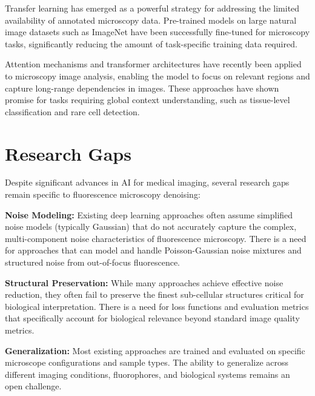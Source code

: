 \documentclass[12pt,a4paper]{report}
\begin{document}
\vspace{0.5cm}

Transfer learning has emerged as a powerful strategy for addressing the limited availability of annotated microscopy data. Pre-trained models on large natural image datasets such as ImageNet have been successfully fine-tuned for microscopy tasks, significantly reducing the amount of task-specific training data required.

\vspace{0.5cm}

Attention mechanisms and transformer architectures have recently been applied to microscopy image analysis, enabling the model to focus on relevant regions and capture long-range dependencies in images. These approaches have shown promise for tasks requiring global context understanding, such as tissue-level classification and rare cell detection.

\section{Research Gaps}

Despite significant advances in AI for medical imaging, several research gaps remain specific to fluorescence microscopy denoising:

\vspace{0.5cm}

\textbf{Noise Modeling:} Existing deep learning approaches often assume simplified noise models (typically Gaussian) that do not accurately capture the complex, multi-component noise characteristics of fluorescence microscopy. There is a need for approaches that can model and handle Poisson-Gaussian noise mixtures and structured noise from out-of-focus fluorescence.

\vspace{0.5cm}

\textbf{Structural Preservation:} While many approaches achieve effective noise reduction, they often fail to preserve the finest sub-cellular structures critical for biological interpretation. There is a need for loss functions and evaluation metrics that specifically account for biological relevance beyond standard image quality metrics.

\vspace{0.5cm}

\textbf{Generalization:} Most existing approaches are trained and evaluated on specific microscope configurations and sample types. The ability to generalize across different imaging conditions, fluorophores, and biological systems remains an open challenge.
\end{document}
